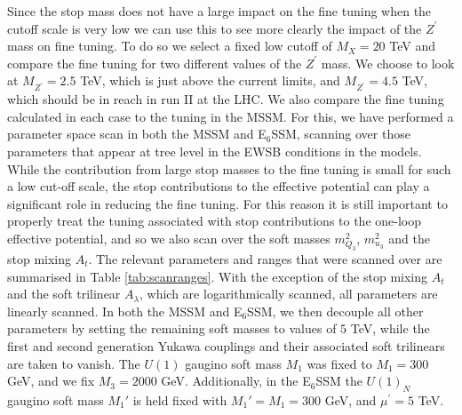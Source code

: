 \documentclass[preprint,amsmath,amssymb,aps,superscriptaddress,prd,showpacs,floatfix]{revtex4-1}
\begin{document}
 


Since the stop mass does not have a large impact on the fine tuning when the 
cutoff scale is very low we can use this to see more clearly the impact of the
$Z^\prime$ mass on fine tuning. To do so we select a fixed low cutoff of $M_X=20$ TeV and compare the
fine tuning for two different values of the $Z^\prime$ mass. We choose to look at
$M_{Z^\prime}=2.5$ TeV, which is just above the current limits, and $M_{Z^\prime}=4.5$ TeV, 
which should be in reach in run II at the LHC. We also compare the fine tuning calculated
in each case to the tuning in the MSSM. For this, we have performed a parameter space scan in both the 
MSSM and E$_6$SSM, scanning over those parameters that appear at tree level in the EWSB conditions in the
models. While the contribution from large stop masses to the fine tuning is small for such a low cut-off scale, the 
stop contributions to the effective potential can play a significant role in reducing the fine tuning.
For this reason it is still important to properly treat the tuning associated with stop contributions to the one-loop effective potential, and so we also scan over the soft masses $m_{Q_3}^2$, $m_{u_3}^2$ and the stop mixing $A_t$.
The relevant parameters and ranges that were scanned over are summarised in Table \ref{tab:scanranges}. With the exception of the stop mixing $A_t$ and the soft trilinear $A_\lambda$, which are logarithmically scanned, all parameters are linearly scanned. In both the MSSM and E$_6$SSM, we then decouple all other parameters by setting the remaining soft masses to values of $5$ TeV, while the first and second generation Yukawa couplings and their associated soft trilinears are taken to vanish. The $U(1)$ gaugino soft mass $M_1$ was fixed to $M_1=300$ GeV, and we fix $M_3=2000$ GeV. Additionally, in the E$_6$SSM the $U(1)_N$ gaugino soft mass $M_1'$ is held fixed with $M_1'=M_1=300$ GeV, and $\mu^\prime=5$ TeV.
\end{document}
